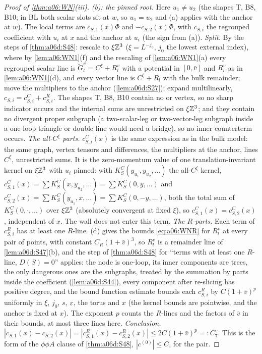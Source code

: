 \begin{proof}[Proof of \cref{thm:a06:WN}\textup{(iii)}]
\emph{(b): the pinned root.} Here $u_1\ne u_2$ (the shapes T, B8, B10; in BL both scalar slots sit at $w$, so $u_1=u_2$ and (a) applies with the anchor at $w$). The local terms are $c_{S,1}(x)\Phi$ and $-c_{S,2}(x)\Phi$, with $c_{S,i}$ the regrouped coefficient with $u_i$ at $x$ and the anchor at $u_i$ (the sign from (a)). \emph{Split.} By the steps of \cref{thm:a06d:S48}: rescale to $\xi\mathbb Z^3$ ($\xi=L^{-j_0}$, $j_0$ the lowest external index), where by \cref{lem:a06:WN1}(f) and the rescaling of \cref{lem:a06:WN1}(a) every regrouped scalar line is $\breve G^v_l=C^\xi+R^v_l$ with a potential in $[0,\bar v]$ and $R^v_l$ as in \cref{lem:a06:WN1}(d), and every vector line is $C^\xi+R_l$ with the bulk remainder; move the multipliers to the anchor (\cref{lem:a06d:S27}); expand multilinearly, $c_{S,i}=c^C_{S,i}+c^R_{S,i}$. The shapes T, B8, B10 contain no \cite[(1.6)]{Ba3} or \cite[(1.7)]{Ba3} vertex, so no sharp indicator occurs and the internal sums are unrestricted on $\xi\mathbb Z^3$; and they contain no divergent proper subgraph (a two-scalar-leg or two-vector-leg subgraph inside a one-loop triangle or double line would need a bridge), so no inner counterterm occurs. \emph{The all-$C^\xi$ parts.} $c^C_{S,i}(x)$ is the same expression as in the bulk model: the same graph, vertex tensors and differences, the multipliers at the anchor, lines $C^\xi$, unrestricted sums. It is the zero-momentum value of one translation-invariant kernel on $\xi\mathbb Z^3$ with $u_i$ pinned: with $K^C_S(y_{u_1},y_{u_2},\dots)$ the all-$C^\xi$ kernel, $c^C_{S,1}(x)=\sum K^C_S(x,y_{u_2},\dots)=\sum K^C_S(0,y,\dots)$ and $c^C_{S,2}(x)=\sum K^C_S(y_{u_1},x,\dots)=\sum K^C_S(0,-y,\dots)$, both the total sum of $K^C_S(0,\cdot,\dots)$ over $\xi\mathbb Z^3$ (absolutely convergent at fixed $\xi$), so $c^C_{S,1}(x)=c^C_{S,2}(x)$, independent of $x$. The wall does not enter this term. \emph{The $R$-parts.} Each term of $c^R_{S,i}$ has at least one $R$-line. (d) gives the bounds \eqref{eq:a06:WNR} for $R^v_l$ at every pair of points, with constant $C_R(1+\bar v)^3$, so $R^v_l$ is a remainder line of \cref{lem:a06d:S47}(b), and the step of \cref{thm:a06d:S48} for ``terms with at least one $R$-line, $D(S)=0$'' applies: the node is one-loop, its inner components are trees, the only dangerous ones are the \cite[(2.4)]{Ba3} subgraphs, treated by the summation by parts inside the coefficient (\cref{lem:a06d:S44}), every component after re-slicing has positive degree, and the bound function estimate \cite[(2.16)]{Ba3} bounds each $c^R_{S,i}$ by $C(1+\bar v)^p$ uniformly in $\xi$, $j_0$, $s$, $\varepsilon$, the torus and $x$ (the kernel bounds are pointwise, and the anchor is fixed at $x$). The exponent $p$ counts the $R$-lines and the factors of $\bar v$ in their bounds, at most three lines here. \emph{Conclusion.} $|c_{S,1}(x)-c_{S,2}(x)|=|c^R_{S,1}(x)-c^R_{S,2}(x)|\le2C(1+\bar v)^p=: C^v_7$. This is the form of the $\phi\phi A$ clause of \cref{thm:a06d:S48}, $|c^{(0)}|\le C$, for the pair.


\end{proof}
